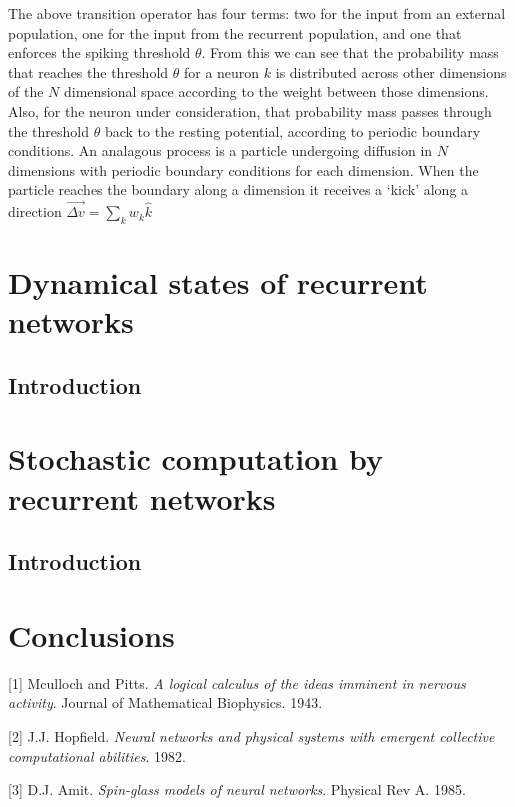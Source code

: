 \documentclass{ucetd}
\begin{document}
The above transition operator has four terms: two for the input from an external population, one for the input from the recurrent population, and one that enforces the spiking threshold $\theta$. From this we can see that the probability mass that reaches the threshold $\theta$ for a neuron $k$ is distributed across other dimensions of the $N$ dimensional space according to the weight between those dimensions. Also, for the neuron under consideration, that probability mass passes through the threshold $\theta$ back to the resting potential, according to periodic boundary conditions. An analagous process is a particle undergoing diffusion in $N$ dimensions with periodic boundary conditions for each dimension. When the particle reaches the boundary along a dimension it receives a `kick' along a direction $\vec{\Delta v} = \sum_{k}w_{k}\hat{k}$ 


\chapter{Dynamical states of recurrent networks}
\section{Introduction}


\chapter{Stochastic computation by recurrent networks}
\section{Introduction}

\chapter{Conclusions}


\makebibliography

[1] Mculloch and Pitts. \textit{A logical calculus of the ideas imminent in nervous activity}. Journal of Mathematical Biophysics. 1943.

[2] J.J. Hopfield. \textit{Neural networks and physical systems with emergent collective computational abilities}. 1982.

[3] D.J. Amit. \textit{Spin-glass models of neural networks}. Physical Rev A. 1985.
\end{document}
